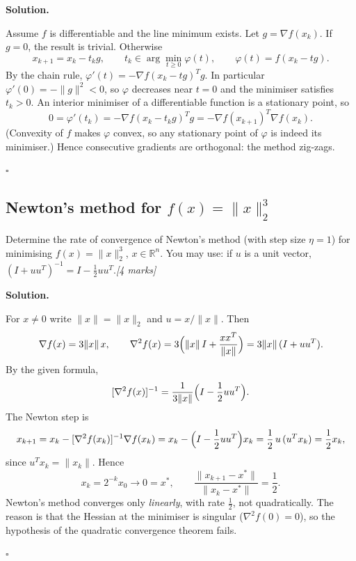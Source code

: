 \documentclass[11pt,a4paper]{article}
\newenvironment{solution}
  {\par\noindent\textbf{Solution.}\par\nobreak}
  {\par\hfill\(\square\)\par}
\newcommand{\mk}[1]{\hfill\textit{[#1 marks]}}
\newcommand{\norm}[1]{\lVert#1\rVert}
\begin{document}
\begin{solution}
Assume \(f\) is differentiable and the line minimum exists.  Let
\(g=\nabla f(x_k)\).  If \(g=0\), the result is trivial.  Otherwise
\[
  x_{k+1}=x_k-t_kg,\qquad t_k\in\arg\min_{t\ge0}\varphi(t),
  \qquad \varphi(t)=f(x_k-tg).
\]
By the chain rule, \(\varphi'(t)=-\nabla f(x_k-tg)^Tg\).  In particular
\(\varphi'(0)=-\norm g^2<0\), so \(\varphi\) decreases near \(t=0\) and
the minimiser satisfies \(t_k>0\).  An interior minimiser of a
differentiable function is a stationary point, so
\[
  0=\varphi'(t_k)=-\nabla f(x_k-t_kg)^Tg=-\nabla f(x_{k+1})^T\nabla f(x_k).
\]
(Convexity of \(f\) makes \(\varphi\) convex, so any stationary point
of \(\varphi\) is indeed its minimiser.)  Hence consecutive gradients
are orthogonal: the method zig-zags.
\end{solution}

\subsection{Newton's method for \(f(x)=\norm x_2^3\)}

\begin{qbox}
Determine the rate of convergence of Newton's method (with step size
\(\eta=1\)) for minimising \(f(x)=\norm x_2^3\), \(x\in\mathbb R^n\).
You may use: if \(u\) is a unit vector,
\((I+uu^T)^{-1}=I-\frac12uu^T\).\mk{4}
\end{qbox}

\begin{solution}
For \(x\ne0\) write \(\norm x=\norm x_2\) and \(u=x/\norm x\).  Then
\[
  \nabla f(x)=3\norm x\,x,
  \qquad
  \nabla^2f(x)=3\Bigl(\norm x\,I+\frac{xx^T}{\norm x}\Bigr)
  =3\norm x\,(I+uu^T).
\]
By the given formula,
\[
  [\nabla^2f(x)]^{-1}=\frac1{3\norm x}\Bigl(I-\frac12uu^T\Bigr).
\]
The Newton step is
\[
  x_{k+1}=x_k-[\nabla^2f(x_k)]^{-1}\nabla f(x_k)
  =x_k-\Bigl(I-\frac12uu^T\Bigr)x_k
  =\frac12\,u\,(u^Tx_k)=\frac12x_k ,
\]
since \(u^Tx_k=\norm{x_k}\).  Hence
\[
  x_k=2^{-k}x_0\to0=x^*,\qquad \frac{\norm{x_{k+1}-x^*}}{\norm{x_k-x^*}}=\frac12 .
\]
Newton's method converges only \emph{linearly}, with rate \(\frac12\),
not quadratically.  The reason is that the Hessian at the minimiser is
singular (\(\nabla^2f(0)=0\)), so the hypothesis of the quadratic
convergence theorem fails.
\end{solution}

\end{document}
